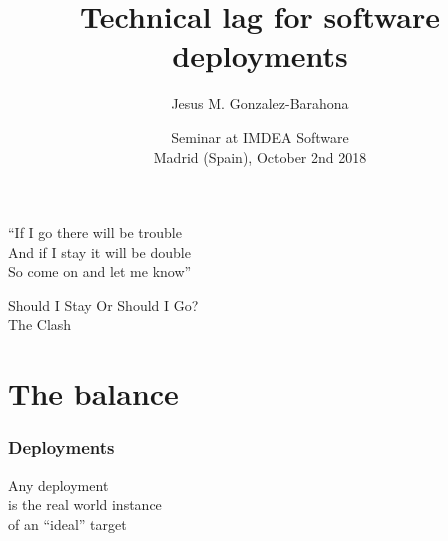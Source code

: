 \documentclass[17pt,aspectratio=169,hyperref=pdfusetitle]{beamer}
\title[Technical lag]{Technical lag for software deployments}
\author[Jesus M. Gonzalez-Barahona]{Jesus M. Gonzalez-Barahona}
\institute[URJC]{Universidad Rey Juan Carlos \\
  @jgbarah ~~~~~ \url{http://github.com/jgbarah/presentations}}
\date[Seminar IMDEA Software ]{Seminar at IMDEA Software \\ Madrid (Spain), October 2nd 2018}
\begin{document}
\begin{frame}
  \maketitle
\end{frame}


\begin{frame}

  {\em
    \begin{center}
      ``If I go there will be trouble \\
      And if I stay it will be double \\
      So come on and let me know''\\
    \end{center}
    \begin{flushright}
      Should I Stay Or Should I Go? \\
      The Clash \\
    \end{flushright}
  }
\end{frame}





\section{The balance}


\begin{frame}[fragile]
  \frametitle{Deployments}

  {\Large
    Any deployment \\
    is the real world instance \\
    of an ``ideal'' target \\
  }
  
\end{frame}
\end{document}
